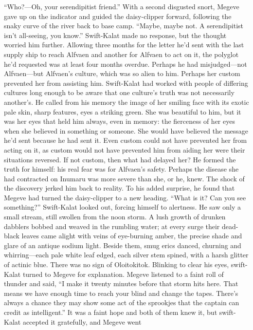 \documentclass[9pt]{article}
\begin{document}
“Who?—Oh, your serendipitist friend.” With a second disgusted snort, Megeve gave up on the
indicator and guided the daisy-clipper forward, following the snaky curve of the river back to base camp.
“Maybe, maybe not. A serendipitist isn’t all-seeing, you know.”
Swift-Kalat made no response, but the thought worried him further.
Allowing three months for the letter he’d sent with the last supply ship to reach Alfvaen and another
for Alfvaen to act on it, the polyglot he’d requested was at least four months overdue. Perhaps he had
misjudged—not Alfvaen—but Alfvaen’s culture, which was so alien to him. Perhaps her custom
prevented her from assisting him. Swift-Kalat had worked with people of differing cultures long enough
to be aware that one culture’s truth was not necessarily another’s.
He called from his memory the image of her smiling face with its exotic pale skin, sharp features, eyes
a striking green. She was beautiful to him, but it was her eyes that held him always, even in memory: the
fierceness of her eyes when she believed in something or someone. She would have believed the message
he’d sent because he had sent it. Even custom could not have prevented her from acting on it, as custom
would not have prevented him from aiding her were their situations reversed.
If not custom, then what had delayed her?
He formed the truth for himself: his real fear was for Alfvaen’s safety. Perhaps the disease she had
contracted on Inumaru was more severe than she, or he, knew.
The shock of the discovery jerked him back to reality. To his added surprise, he found that Megeve
had turned the daisy-clipper to a new heading.
“What is it? Can you see something?” Swift-Kalat looked out, forcing himself to alertness.
He saw only a small stream, still swollen from the noon storm. A lush growth of drunken dabblers
bobbed and weaved in the rumbling water; at every surge their dead-black leaves came alight with veins
of eye-burning amber, the precise shade and glare of an antique sodium light. Beside them, smug erics
danced, churning and whirring—each pale white leaf edged, each silver stem spined, with a harsh glitter
of actinic blue. There was no sign of Oloitokitok. Blinking to clear his eyes, swift-Kalat turned to Megeve
for explanation.
Megeve listened to a faint roll of thunder and said, “I make it twenty minutes before that storm hits
here. That means we have enough time to reach your blind and change the tapes. There’s always a
chance they may show some act of the sprookjes that the captain can credit as intelligent.”
It was a faint hope and both of them knew it, but swift-Kalat accepted it gratefully, and Megeve went
\end{document}

